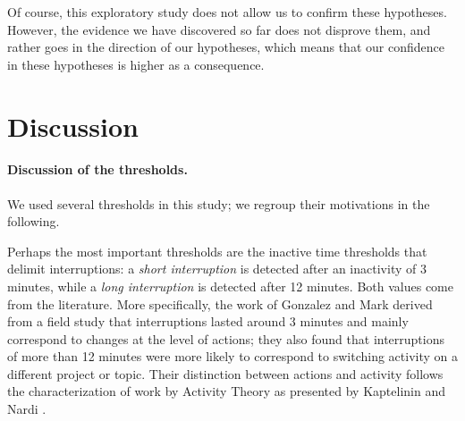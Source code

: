 \documentclass[times]{smrauth}
\begin{document}

Of course, this exploratory study does not allow us to confirm these hypotheses. However, the evidence we have discovered so far does not disprove them, and rather goes in the direction of our hypotheses, which means that our confidence in these hypotheses is higher as a consequence.



\section{Discussion}

\paragraph{Discussion of the thresholds.} We used several thresholds in this study; we regroup their motivations in the following. 


Perhaps the most important thresholds are the inactive time thresholds that delimit interruptions: a \emph{short interruption} is detected after an inactivity of 3 minutes, while a \emph{long interruption} is detected after 12 minutes. Both values come from the literature. More specifically, the work of Gonzalez and Mark \cite{GM04} derived from a field study that interruptions lasted around 3 minutes and mainly correspond to changes at the level of actions; they also found that interruptions of more than 12 minutes were more likely to correspond to switching activity on a different project or topic. Their distinction between actions and activity follows the characterization of work by Activity Theory as presented by Kaptelinin and Nardi \cite{KaptelininN07}.
\end{document}
